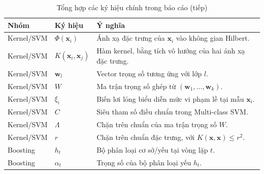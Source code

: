 \begin{table}[H]
\centering
\small
\caption{Tổng hợp các ký hiệu chính trong báo cáo (tiếp)}
\begin{tabular}{|>{\raggedright\arraybackslash}p{3.2cm}|>{\raggedright\arraybackslash}p{4.2cm}|>{\raggedright\arraybackslash}p{6.6cm}|}
\hline
\textbf{Nhóm} & \textbf{Ký hiệu} & \textbf{Ý nghĩa} \\
\hline
Kernel/SVM & $\Phi(\bm{x}_i)$ & Ánh xạ đặc trưng của $\bm{x}_i$ vào không gian Hilbert. \\
\hline
Kernel/SVM & $K(\bm{x}_i,\bm{x}_j)$ & Hàm kernel, bằng tích vô hướng của hai ánh xạ đặc trưng. \\
\hline
Kernel/SVM & $\bm{w}_l$ & Vector trọng số tương ứng với lớp $l$. \\
\hline
Kernel/SVM & $W$ & Ma trận trọng số ghép từ $(\bm{w}_1,\ldots,\bm{w}_k)$. \\
\hline
Kernel/SVM & $\xi_i$ & Biến lơi lỏng biểu diễn mức vi phạm lề tại mẫu $\bm{x}_i$. \\
\hline
Kernel/SVM & $C$ & Siêu tham số điều chuẩn trong Multi-class SVM. \\
\hline
Kernel/SVM & $\Lambda$ & Chặn trên chuẩn của ma trận trọng số $W$. \\
\hline
Kernel/SVM & $r$ & Chặn trên chuẩn đặc trưng, với $K(\bm{x},\bm{x})\leq r^2$. \\
\hline
Boosting & $h_t$ & Bộ phân loại cơ sở/yếu tại vòng lặp $t$. \\
\hline
Boosting & $\alpha_t$ & Trọng số của bộ phân loại yếu $h_t$. \\
\hline
\end{tabular}
\end{table}

